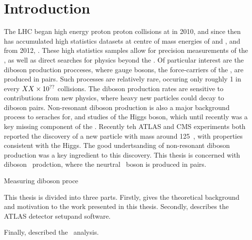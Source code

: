 \graphicspath{{Chapters/Introduction/Figures/}}

\chapter*{Introduction}
\label{chap:Introduction}

The LHC began high energy proton proton collisions at in 2010, and since then
has accumulated high statistics datasets at centre of mass energies of
and  , and from 2012, . These high statistics samples
allow for precision measurements of the \sm, as well as direct searches for
physics beyond the \sm. Of particular interest are the diboson production
procceses, where gauge bosons, the force-carriers of the \sm, are produced in
pairs. Such processes are relatively rare, occuring only roughly 1 in every
$XX\times 10 ^{??}$ collisions. The diboson production rates are sensitive to
contributions from new physics, where heavy new particles could decay to diboson
pairs. Non-resonant diboson production is also a major background process to
seraches for, and studies of the Higgs boson, which until recently was a key
missing component of the \sm. Recently teh ATLAS and CMS experiments both
reported the discovery of a new particle with mass around 125~\gev, with
properties consistent with the Higgs. The good undertsanding of non-resonant
diboson production was a key ingredient to this discovery. This thesis is
concerned with diboson \ZZ\ prodction, where the neurtral \Z\ boson is produced
in pairs.

Measuring diboson proce

This thesis is divided into three parts. Firstly,  gives the theoretical background
and motivation to the work presented in this thesis.
Secondly,  describes the ATLAS detector setupand software.

Finally,  described the \ZZ\ analysis.

